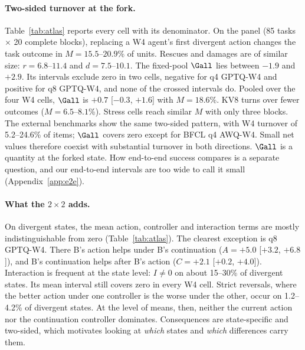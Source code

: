 \paragraph{Two-sided turnover at the fork.} Table~\ref{tab:atlas} reports every cell with its denominator. On the \tautwo{} panel (85 tasks $\times$ 20 complete blocks), replacing a W4 agent's first divergent action changes the task outcome in $M=15.5$--$20.9$\% of units. %
Rescues and damages are of similar size: $r=6.8$--$11.4$ and $d=7.5$--$10.1$\pp{}. The fixed-pool $\Gall$ lies between $-1.9$ and $+2.9$\pp{}. Its intervals exclude zero in two cells, negative for q4 GPTQ-W4 and positive for q8 GPTQ-W4, and none of the crossed intervals do. Pooled over the four W4 cells, $\Gall$ is $+0.7$ [$-0.3$, $+1.6$]\pp{} with $M=18.6$\%. %
KV8 turns over fewer outcomes ($M=6.5$--$8.1$\%). Stress cells reach similar $M$ with only three blocks. %
 The external benchmarks show the same two-sided pattern, with W4 turnover of 5.2--24.6\% of items; $\Gall$ covers zero except for BFCL q4 AWQ-W4. %
Small net values therefore coexist with substantial turnover in both directions. $\Gall$ is a quantity at the forked state. How end-to-end success compares is a separate question, and our end-to-end intervals are too wide to call it small (Appendix~\ref{app:e2e}).

\paragraph{What the $2\times2$ adds.} On divergent states, the mean action, controller and interaction terms are mostly indistinguishable from zero (Table~\ref{tab:atlas}). The clearest exception is q8 GPTQ-W4. There B's action helps under B's continuation ($A=+5.0$ [$+3.2$, $+6.8$]), and B's continuation helps after B's action ($C=+2.1$ [$+0.2$, $+4.0$]). Interaction is frequent at the state level: $I\neq0$ on about 15--30\% of divergent states. Its mean interval still covers zero in every W4 cell. Strict reversals, where the better action under one controller is the worse under the other, occur on 1.2--4.2\% of divergent states. %
At the level of means, then, neither the current action nor the continuation controller dominates. Consequences are state-specific and two-sided, which motivates looking at \emph{which} states and \emph{which} differences carry them.

